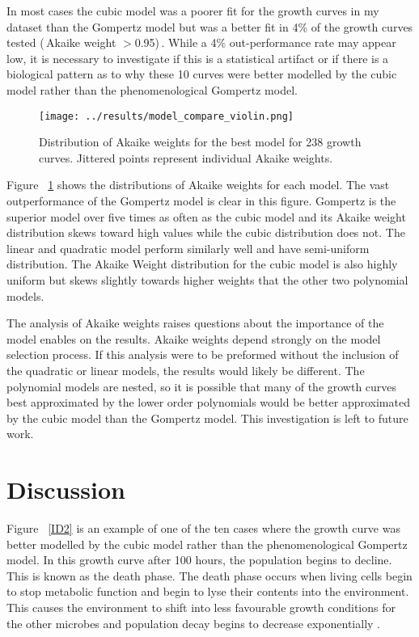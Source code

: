 \documentclass[11pt]{article}
\begin{document}
  In most cases the cubic model was a poorer fit for the growth curves in my dataset than the Gompertz model but was a better fit in 4\% of the growth curves tested (\,Akaike weight $>$0.95)\,. While a 4\% out-performance rate may appear low, it is necessary to investigate if this is a statistical artifact or if there is a biological pattern as to why these 10 curves were better modelled by the cubic model rather than the phenomenological Gompertz model. 

  \begin{figure}[!ht]
    \centering
    \texttt{[image: ../results/model\_compare\_violin.png]}
    \caption{Distribution of Akaike weights for the best model for 238 growth curves. Jittered points represent individual Akaike weights.}
    \label{violin}
   \end{figure}

  Figure ~\ref{violin} shows the distributions of Akaike weights for each model. The vast outperformance of the Gompertz model is clear in this figure. Gompertz is the superior model over five times as often as the cubic model and its Akaike weight distribution skews toward high values while the cubic distribution does not. The linear and quadratic model perform similarly well and have semi-uniform distribution. The Akaike Weight distribution for the cubic model is also highly uniform but skews slightly towards higher weights that the other two polynomial models. 

  The analysis of Akaike weights raises questions about the importance of the model enables on the results. Akaike weights depend strongly on the model selection process. If this analysis were to be preformed without the inclusion of the quadratic or linear models, the results would likely be different. The polynomial models are nested, so it is possible that many of the growth curves best approximated by the lower order polynomials would be better approximated by the cubic model than the Gompertz model. This investigation is left to future work.
  

  \section{Discussion}

  Figure ~\ref{ID2}
  is an example of one of the ten cases where the growth curve was better modelled by the cubic model rather than the phenomenological Gompertz model. In this growth curve after  100 hours, the population begins to decline. This is known as the death phase. The death phase occurs when living cells begin to stop metabolic function and begin to lyse their contents into the environment. This causes the environment to shift into less favourable growth conditions for the other microbes and population decay begins to decrease exponentially \citep{Madigan_Michael2021-07-01}. 
\end{document}

